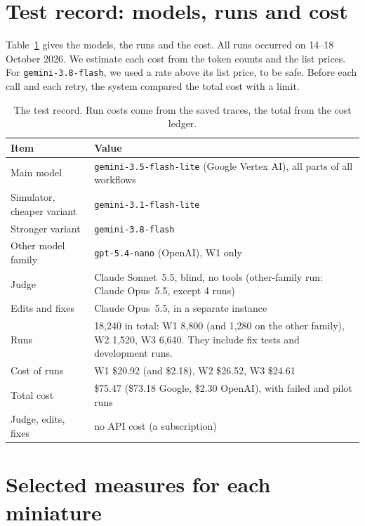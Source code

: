 \section{Test record: models, runs and cost}
\label{app:record}

Table~\ref{tab:record} gives the models, the runs and the cost. All runs occurred on 14--18
October 2026. We estimate each cost from the token counts and the list prices. For
\texttt{gemini-3.8-flash}, we used a rate above its list price, to be safe. Before each call and
each retry, the system compared the total cost with a limit.

\begin{table}[h]
\centering\scriptsize
\renewcommand{\arraystretch}{1.08}
\begin{tabular}{@{}p{24mm}p{47.5mm}@{}}
\toprule
\textbf{Item} & \textbf{Value} \\
\midrule
Main model & \texttt{gemini-3.5-flash-lite} (Google Vertex AI), all parts of all workflows \\
Simulator, cheaper variant & \texttt{gemini-3.1-flash-lite} \\
Stronger variant & \texttt{gemini-3.8-flash} \\
Other model family & \texttt{gpt-5.4-nano} (OpenAI), W1 only \\
Judge & Claude Sonnet~5.5, blind, no tools (other-family run: Claude Opus~5.5, except 4 runs) \\
Edits and fixes & Claude Opus~5.5, in a separate instance \\
\midrule
Runs & 18{,}240 in total: W1 8{,}800 (and 1{,}280 on the other family), W2 1{,}520, W3 6{,}640.
They include fix tests and development runs. \\
Cost of runs & W1 \$20.92 (and \$2.18), W2 \$26.52, W3 \$24.61 \\
Total cost & \$75.47 (\$73.18 Google, \$2.30 OpenAI), with failed and pilot runs \\
Judge, edits, fixes & no API cost (a subscription) \\
\bottomrule
\end{tabular}
\caption{The test record. Run costs come from the saved traces, the total from the cost ledger.}
\label{tab:record}
\end{table}

\section{Selected measures for each miniature}
\label{app:all}


